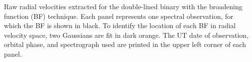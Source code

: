 \label{fig:bffig} Raw radial velocities extracted for the double-lined binary with the broadening function (BF) technique. Each panel represents one spectral observation, for which the BF is shown in black. To identify the location of each BF in radial velocity space, two Gaussians are fit in dark orange. The UT date of observation, orbital phase, and spectrograph used are printed in the upper left corner of each panel.